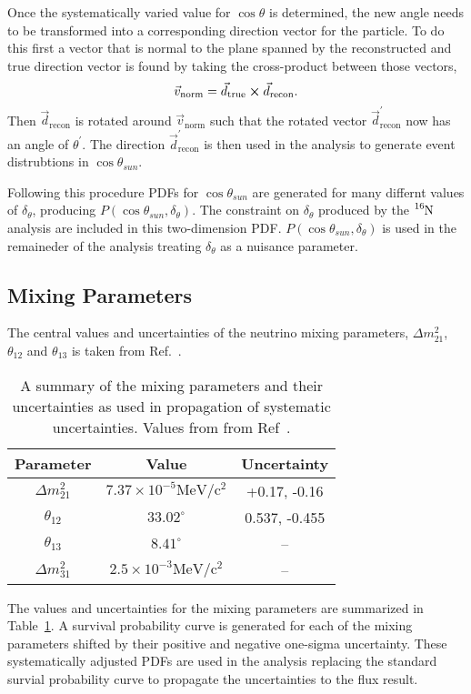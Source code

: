 Once the systematically varied value for $\cos\theta$ is determined, the new angle
needs to be transformed into a corresponding direction vector for the particle.
To do this first a vector that is normal to the plane spanned by the reconstructed
and true direction vector is found by taking the cross-product between those vectors,
\begin{equation}
    \vec{v}_{\mathrm{norm}} = \vec{d}_{\mathrm{true}} \cross \vec{d}_{\mathrm{recon}}\text{.}
\end{equation}
Then $\vec{d}_{\mathrm{recon}}$ is rotated around $\vec{v}_{\mathrm{norm}}$
such that the rotated vector $\vec{d}^{\prime}_{\mathrm{recon}}$ now has an angle
of $\theta^{\prime}$.
The direction $\vec{d}^{\prime}_{\mathrm{recon}}$ is then used in the
analysis to generate event distrubtions in $\cos\theta_{sun}$.

Following this procedure PDFs for $\cos\theta_{sun}$ are generated for many differnt
values of $\delta_{\theta}$, producing $P(\cos\theta_{sun}, \delta_{\theta})$.
The constraint on $\delta_{\theta}$ produced by the $\ce{^{16}N}$ analysis
are included in this two-dimension PDF\@.
$P(\cos\theta_{sun}, \delta_{\theta})$ is used in the remaineder of the analysis
treating $\delta_{\theta}$ as a nuisance parameter.

\subsection{Mixing Parameters}
The central values and uncertainties of the neutrino mixing parameters, $\Delta
m^{2}_{21}$, $\theta_{12}$ and $\theta_{13}$ is taken from Ref.~\citep{pdg_globalfit}.
\begin{table}
    \centering
    \begin{tabular}{c | c | c}
        Parameter & Value & Uncertainty\\
        \hline
        $\Delta m^{2}_{21}$ & $7.37\times10^{-5} \mathrm{MeV}/\mathrm{c}^{2}$ & +0.17, -0.16\\
        $\theta_{12}$ & $33.02^{\circ}$ & 0.537, -0.455 \\
        $\theta_{13}$ & $8.41^{\circ}$ & -- \\
        $\Delta m^{2}_{31}$ & $2.5\times10^{-3}\mathrm{MeV}/\mathrm{c}^{2}$ & -- \\
    \end{tabular}
    \caption{A summary of the mixing parameters and their uncertainties as used in 
    propagation of systematic uncertainties. Values from from Ref~\citep{pdg_globalfit}.}
\label{tbl:mixing_values}
\end{table}
The values and uncertainties for the mixing parameters
are summarized in Table~\ref{tbl:mixing_values}.
A survival probability curve is generated for each of the mixing parameters
shifted by their positive and negative one-sigma uncertainty.
These systematically adjusted PDFs are used in the analysis replacing the
standard survial probability curve to propagate the uncertainties to the
flux result.
